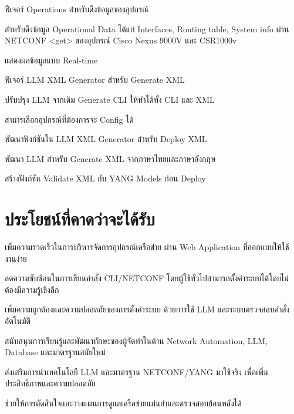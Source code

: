 \begin{mycustomenum2}
    \item ฟีเจอร์ Operations สำหรับดึงข้อมูลของอุปกรณ์
    \begin{mycustomenum2}
        \item สำหรับดึงข้อมูล Operational Data ได้แก่ Interfaces, Routing table, System info ผ่าน NETCONF <get> ของอุปกรณ์ Cisco Nexus 9000V และ CSR1000v
        \item แสดงผลข้อมูลแบบ Real-time
    \end{mycustomenum2}

    \item ฟีเจอร์ LLM XML Generator สำหรับ Generate XML
    \begin{mycustomenum2}
        \item ปรับปรุง LLM จากเดิม Generate CLI ให้ทำได้ทั้ง CLI และ XML
        \item สามารเลือกอุปกรณ์ที่ต้องการจะ Config ได้
        \item พัฒนาฟังก์ชันใน LLM XML Generator สำหรับ Deploy XML
        \item พัฒนา LLM สำหรับ Generate XML จากภาษาไทยและภาษาอังกฤษ
        \item สร้างฟังก์ชัน Validate XML กับ YANG Models ก่อน Deploy
    \end{mycustomenum2}
    
\end{mycustomenum2}
\section{ประโยชน์ที่คาดว่าจะได้รับ}

\begin{mycustomenum}[label=1.4.\arabic*] %
    \item เพิ่มความรวดเร็วในการบริหารจัดการอุปกรณ์เครือข่าย ผ่าน Web Application ที่ออกแบบให้ใช้งานง่าย
    \item ลดความซับซ้อนในการเขียนคำสั่ง CLI/NETCONF โดยผู้ใช้ทั่วไปสามารถตั้งค่าระบบได้โดยไม่ต้องมีความรู้เชิงลึก 
    \item เพิ่มความถูกต้องและความปลอดภัยของการตั้งค่าระบบ ด้วยการใช้ LLM และระบบตรวจสอบคำสั่งอัตโนมัติ  
    \item สนับสนุนการเรียนรู้และพัฒนาทักษะของผู้จัดทำในด้าน Network Automation, LLM, Database และมาตรฐานสมัยใหม่
    \item ส่งเสริมการนำเทคโนโลยี LLM และมาตรฐาน NETCONF/YANG มาใช้จริง เพื่อเพิ่มประสิทธิภาพและความปลอดภัย  
    \item ช่วยให้การตัดสินใจและวางแผนการดูแลเครือข่ายแม่นยำและตรวจสอบย้อนหลังได้ 
\end{mycustomenum}
